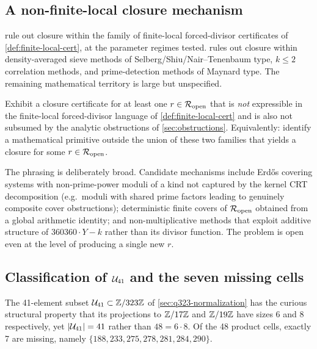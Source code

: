 \subsection{A non-finite-local closure mechanism}
\label{sec:open-non-local}

 rule
out closure within the family of finite-local forced-divisor
certificates of \cref{def:finite-local-cert}, at the parameter
regimes tested.  rules out closure within
density-averaged sieve methods of Selberg/Shiu/Nair--Tenenbaum
type, $k \le 2$ correlation methods, and prime-detection methods
of Maynard type. The remaining mathematical territory is large but
unspecified.

\begin{problem}
\label{prob:non-local}
Exhibit a closure certificate for at least one $r \in \mathcal{R}_{\mathrm{open}}$ that
is \emph{not} expressible in the finite-local forced-divisor
language of \cref{def:finite-local-cert} and is also not subsumed
by the analytic obstructions of \cref{sec:obstructions}.
Equivalently: identify a mathematical primitive outside the union
of these two families that yields a closure for some $r \in
\mathcal{R}_{\mathrm{open}}$.
\end{problem}

The phrasing is deliberately broad. Candidate mechanisms include
Erd\H{o}s covering systems with non-prime-power moduli of a kind not
captured by the kernel CRT decomposition (e.g.\ moduli with shared
prime factors leading to genuinely composite cover obstructions);
deterministic finite covers of $\mathcal{R}_{\mathrm{open}}$ obtained from a global
arithmetic identity; and non-multiplicative methods that exploit
additive structure of $360360 \cdot Y - k$ rather than its divisor
function. The problem is open even at the level of producing a
single new $r$.

\subsection{Classification of $\mathcal{U}_{41}$ and the seven missing cells}
\label{sec:open-classify}

The 41-element subset $\mathcal{U}_{41} \subset \mathbb{Z} / 323\mathbb{Z}$ of
\cref{sec:q323-normalization} has the curious structural property
that its projections to $\mathbb{Z} / 17\mathbb{Z}$ and $\mathbb{Z} / 19\mathbb{Z}$ have sizes 6
and 8 respectively, yet $|\mathcal{U}_{41}| = 41$ rather than $48 = 6 \cdot 8$.
Of the 48 product cells, exactly 7 are missing, namely $\{188, 233,
275, 278, 281, 284, 290\}$.

